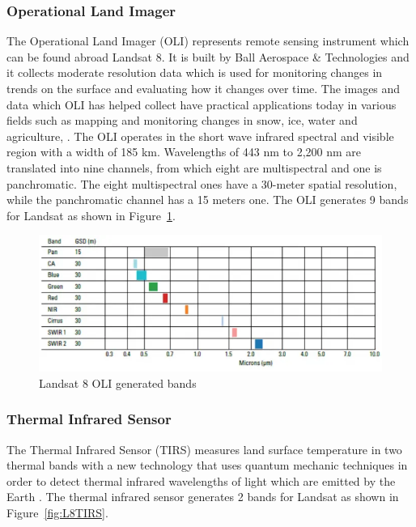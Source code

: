 \documentclass[12pt, a4paper]{report}
\begin{document}
	\subsubsection{Operational Land Imager}
	
	\par The Operational Land Imager (OLI) represents remote sensing instrument which can be found abroad Landsat 8. It is built by Ball Aerospace \& Technologies and it collects moderate resolution data which is used for monitoring changes in trends on the surface and evaluating how it changes over time. The images and data which OLI has helped collect have practical applications today in various fields such as mapping and monitoring changes in snow, ice, water and agriculture, \cite{KNIGHT2014}. 
	The OLI operates in the short wave infrared spectral and visible region with a width of 185 km. Wavelengths of 443 nm to 2,200 nm are translated into nine channels, from which  eight are multispectral and one is panchromatic. The eight multispectral ones have a 30-meter spatial resolution, while the panchromatic channel has a 15 meters one.
	The OLI generates 9 bands for Landsat as shown in Figure~\ref{fig:L8OLI}.
	\begin{figure}[h]
		\centering
		\includegraphics[scale=0.5]{../images/Landsat8-OLI-Bands.png}
		\caption{Landsat 8 OLI generated bands \cite{l8otb}}
		\label{fig:L8OLI}
	\end{figure}
	
	\subsubsection{Thermal Infrared Sensor}
	
	\par The Thermal Infrared Sensor (TIRS) measures land surface temperature in two thermal bands with a new technology that uses quantum mechanic techniques in order to detect thermal infrared wavelengths of light which are emitted by the Earth \cite{lgng}. The thermal infrared sensor generates 2 bands for Landsat as shown in Figure~\ref{fig:L8TIRS}.
	
\end{document}
